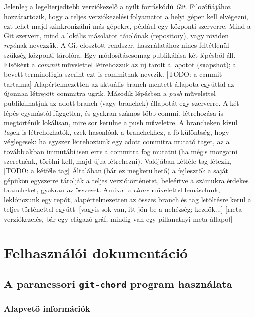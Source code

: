 \documentclass[final]{elteikthesis}[2025/03/25]
\begin{document}
Jelenleg a legelterjedtebb verziókezelő a nyílt forráskódú \textit{Git}.
Filozófiájához hozzátartozik,
hogy a teljes verziókezelési folyamatot a helyi gépen kell elvégezni,
ezt lehet majd szinkronizálni más gépekre, például egy központi szerverre.
Mind a Git szervert, mind a lokális másolatot tárolónak (repository),
vagy röviden \textit{repó}nak nevezzük.
A Git elosztott rendszer,
használatához nincs feltétlenül szükség központi tárolóra.
Egy módosításcsomag publikálása két lépésből áll.
Elsőként a \textit{commit} művelettel létrehozzuk az új tárolt állapotot (snapshot);
a bevett terminológia szerint ezt is commitnak nevezik.
[TODO: a commit tartalma]
Alapértelmezetten az aktuális branch mentett állapota egyúttal az újonnan létrejött commitra ugrik.
Második lépésben a \textit{push} művelettel publikálhatjuk az adott branch (vagy branchek) állapotát egy szerverre.
A két lépés egymástól független,
és gyakran számos több commit létrehozása is megtörténik lokálisan,
mire sor kerülne a push műveletre.
A brancheken kívül \textit{tag}ek is létrehozhatók,
ezek hasonlóak a branchekhez,
a fő különbség, hogy véglegesek:
ha egyszer létrehoztunk egy adott commitra mutató taget,
az a továbbiakban immutábilisen erre a commitra fog mutatni
(ha mégis mozgatni szeretnénk, törölni kell, majd újra létrehozni).
Valójában kétféle tag létezik,
[TODO: a kétféle tag]
Általában (bár ez megkerülhető) a fejlesztők a saját gépükön
egyszerre tárolják a teljes verziótörténetet,
beleértve a számukra érdekes brancheket, gyakran az összeset.
Amikor a \textit{clone} művelettel lemásolunk, leklónozunk egy repót,
alapértelmezetten az összes branch és tag letöltésre kerül a teljes történettel együtt.
[vagyis sok van, itt jön be a nehézség; kezdők...]
[meta-verziókezelés, bár egy elágazó gráf, mindig van egy pillanatnyi meta-állapot]

\cleardoublepage

\chapter{Felhasználói dokumentáció}

\section{A parancssori \texttt{git-chord} program használata}

\subsection{Alapvető információk}
\end{document}
